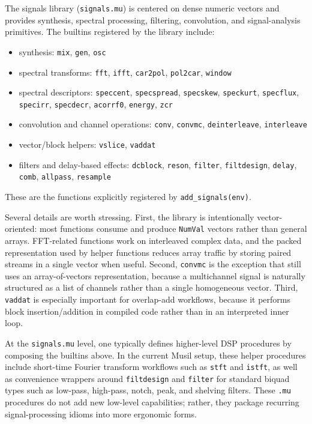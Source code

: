 \documentclass[11pt,a4paper]{article}
\newcommand{\musil}[1]{\lstinline[style=musilinline]{#1}}
\begin{document}
The signals library (\musil{signals.mu}) is centered on dense numeric vectors and provides synthesis, spectral processing, filtering, convolution, and signal-analysis primitives. The builtins registered by the library include:
\begin{itemize}
    \item synthesis: \texttt{mix}, \texttt{gen}, \texttt{osc}
    \item spectral transforms: \texttt{fft}, \texttt{ifft}, \texttt{car2pol}, \texttt{pol2car}, \texttt{window}
    \item spectral descriptors: \texttt{speccent}, \texttt{specspread}, \texttt{specskew}, \texttt{speckurt}, \texttt{specflux}, \texttt{specirr}, \texttt{specdecr}, \texttt{acorrf0}, \texttt{energy}, \texttt{zcr}
    \item convolution and channel operations: \texttt{conv}, \texttt{convmc}, \texttt{deinterleave}, \texttt{interleave}
    \item vector/block helpers: \texttt{vslice}, \texttt{vaddat}
    \item filters and delay-based effects: \texttt{dcblock}, \texttt{reson}, \texttt{filter}, \texttt{filtdesign}, \texttt{delay}, \texttt{comb}, \texttt{allpass}, \texttt{resample}
\end{itemize}
These are the functions explicitly registered by \texttt{add\_signals(env)}. 

Several details are worth stressing. First, the library is intentionally vector-oriented: most functions consume and produce \texttt{NumVal} vectors rather than general arrays. FFT-related functions work on interleaved complex data, and the packed representation used by helper functions reduces array traffic by storing paired streams in a single vector when useful. Second, \texttt{convmc} is the exception that still uses an array-of-vectors representation, because a multichannel signal is naturally structured as a list of channels rather than a single homogeneous vector. Third, \texttt{vaddat} is especially important for overlap-add workflows, because it performs block insertion/addition in compiled code rather than in an interpreted inner loop. 

At the \texttt{signals.mu} level, one typically defines higher-level DSP procedures by composing the builtins above. In the current Musil setup, these helper procedures include short-time Fourier transform workflows such as \texttt{stft} and \texttt{istft}, as well as convenience wrappers around \texttt{filtdesign} and \texttt{filter} for standard biquad types such as low-pass, high-pass, notch, peak, and shelving filters. These \texttt{.mu} procedures do not add new low-level capabilities; rather, they package recurring signal-processing idioms into more ergonomic forms.
\end{document}
